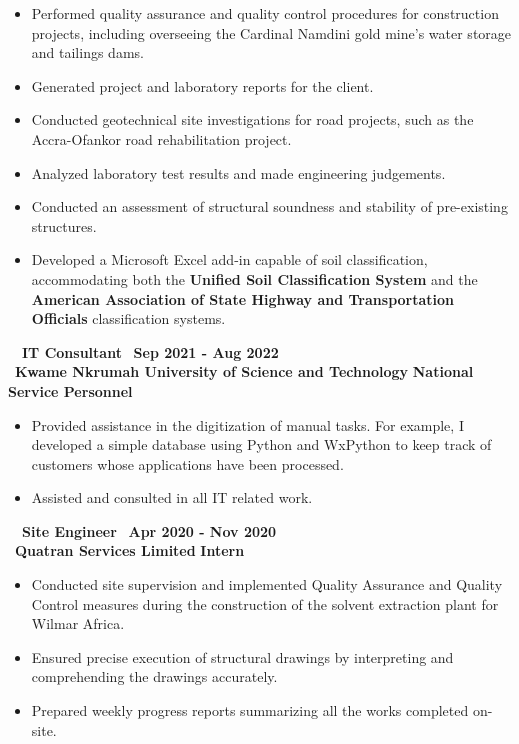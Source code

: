 \documentclass[letterpaper, 12pt]{article}
\newcommand{\verticalSpace}{4pt}
\begin{document}
\begin{itemize}[leftmargin=*]

	\item Performed quality assurance and quality control procedures for construction projects, including
	      overseeing the Cardinal Namdini gold mine's water storage and tailings dams.
	\item Generated project and laboratory reports for the client.
	\item Conducted geotechnical site investigations for road projects, such as the Accra-Ofankor
	      road rehabilitation project.
	\item Analyzed laboratory test results and made engineering judgements.
	\item Conducted an assessment of structural soundness and stability of pre-existing structures.
	\item Developed a Microsoft Excel add-in capable of soil classification, accommodating both the
	      \textbf{Unified Soil Classification System} and the
	      \textbf{American Association of State Highway and Transportation Officials} classification systems.

\end{itemize}

\faUser \, \, \textbf{IT Consultant} \hfill \faCalendar \, \textbf{Sep 2021 - Aug 2022} \\ [\verticalSpace]
\faInstitution \, \textbf{Kwame Nkrumah University of Science and Technology} \hfill \textbf{National Service Personnel}

\begin{itemize}[leftmargin=*]

	\item Provided assistance in the digitization of manual tasks. For example,
	      I developed a simple database using Python and WxPython to keep track of
	      customers whose applications have been processed.
	\item Assisted and consulted in all IT related work.

\end{itemize}

\faUser \, \, \textbf{Site Engineer} \hfill \faCalendar \, \textbf{Apr 2020 - Nov 2020} \\ [\verticalSpace]
\faInstitution \, \textbf{Quatran Services Limited} \hfill \textbf{Intern}

\begin{itemize}[leftmargin=*]

	\item Conducted site supervision and implemented Quality Assurance and Quality Control
	      measures during the construction of the solvent extraction plant for Wilmar Africa.
	\item Ensured precise execution of structural drawings by interpreting and comprehending
	      the drawings accurately.
	\item Prepared weekly progress reports summarizing all the works completed on-site.

\end{itemize}
\end{document}
